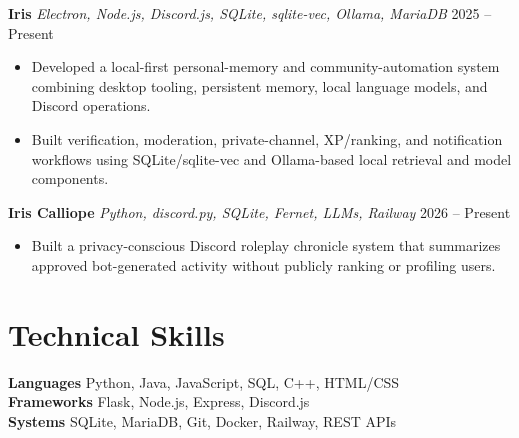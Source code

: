\documentclass[letterpaper,10pt]{article}
\newcommand{\projectentry}[3]{
  \noindent\textbf{#1} \textbar{} \textit{#2} \hfill #3
}
\begin{document}
\smallskip

\projectentry
  {Iris}
  {Electron, Node.js, Discord.js, SQLite, sqlite-vec, Ollama, MariaDB}
  {2025 -- Present}
\begin{itemize}
  \item Developed a local-first personal-memory and community-automation system combining desktop tooling, persistent memory, local language models, and Discord operations.
  \item Built verification, moderation, private-channel, XP/ranking, and notification workflows using SQLite/sqlite-vec and Ollama-based local retrieval and model components.
\end{itemize}

\smallskip

\projectentry
  {Iris Calliope}
  {Python, discord.py, SQLite, Fernet, LLMs, Railway}
  {2026 -- Present}
\begin{itemize}
  \item Built a privacy-conscious Discord roleplay chronicle system that summarizes approved bot-generated activity without publicly ranking or profiling users.
\end{itemize}

\section{Technical Skills}

\noindent\textbf{Languages} \quad Python, Java, JavaScript, SQL, C++, HTML/CSS \\[1pt]
\noindent\textbf{Frameworks} \quad Flask, Node.js, Express, Discord.js \\[1pt]
\noindent\textbf{Systems} \quad SQLite, MariaDB, Git, Docker, Railway, REST APIs
\end{document}
